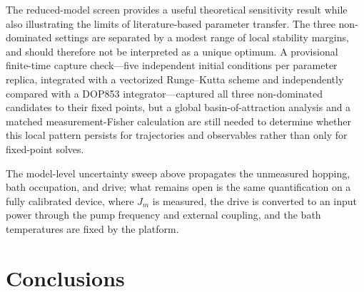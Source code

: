 \documentclass[aip,cha,reprint]{revtex4-2}
\begin{document}
The reduced-model screen provides a useful theoretical sensitivity result while also
illustrating the limits of literature-based parameter transfer. The three
non-dominated settings are separated by a modest range of local stability margins,
and should therefore not be interpreted as a unique optimum. A provisional
finite-time capture check---five independent initial conditions per parameter
replica, integrated with a vectorized Runge--Kutta scheme and independently compared
with a DOP853 integrator---captured all three non-dominated candidates to their fixed
points, but a global basin-of-attraction analysis and a matched measurement-Fisher
calculation are still needed to determine whether this local pattern persists for
trajectories and observables rather than only for fixed-point solves.

The model-level uncertainty sweep above propagates the unmeasured hopping, bath
occupation, and drive; what remains open is the same quantification on a fully
calibrated device, where $J_m$ is measured, the drive is converted to an input
power through the pump frequency and external coupling, and the bath
temperatures are fixed by the platform.

\section{Conclusions}
\end{document}
